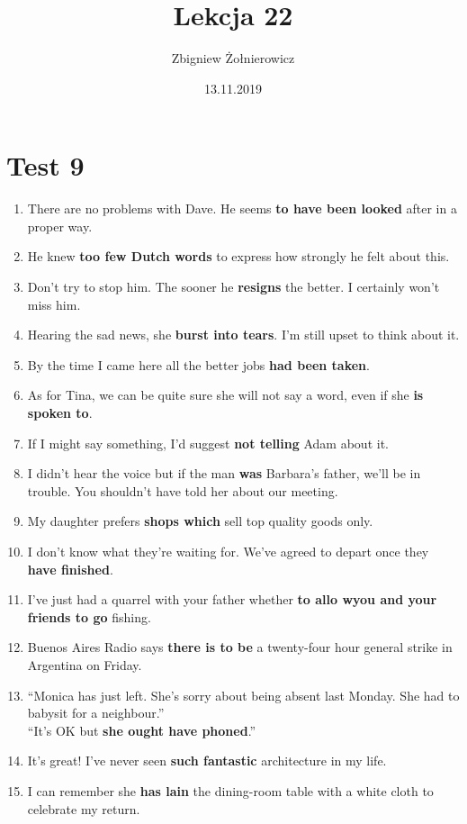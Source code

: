 \documentclass[a4paper]{article}
\begin{document}
\title{{\huge Lekcja 22} \\
{\large }}
\author{Zbigniew Żołnierowicz}
\date{13.11.2019}
\maketitle
\section{Test 9}
\begin{enumerate}
    \item There are no problems with Dave. He seems {\bf to have been looked} after in a proper way.
    \item He knew {\bf too few Dutch words} to express how strongly he felt about this.
    \item Don't try to stop him. The sooner he {\bf resigns} the better. I certainly won't miss him.
    \item Hearing the sad news, she {\bf burst into tears}. I'm still upset to think about it.
    \item By the time I came here all the better jobs {\bf had been taken}.
    \item As for Tina, we can be quite sure she will not say a word, even if she {\bf is spoken to}.
    \item If I might say something, I'd suggest {\bf not telling} Adam about it.
    \item I didn't hear the voice but if the man {\bf was} Barbara's father, we'll be in trouble. You shouldn't have told her about our meeting.
    \item My daughter prefers {\bf shops which} sell top quality goods only.
    \item I don't know what they're waiting for. We've agreed to depart once they {\bf have finished}.
    \item I've just had a quarrel with your father whether {\bf to allo wyou and your friends to go} fishing.
    \item Buenos Aires Radio says {\bf there is to be} a twenty-four hour general strike in Argentina on Friday.
    \item ``Monica has just left. She's sorry about being absent last Monday. She had to babysit for a neighbour.'' \\
    ``It's OK but {\bf she ought have phoned}.''
    \item It's great! I've never seen {\bf such fantastic} architecture in my life.
    \item I can remember she {\bf has lain} the dining-room table with a white cloth to celebrate my return.
\end{enumerate}
\end{document}
